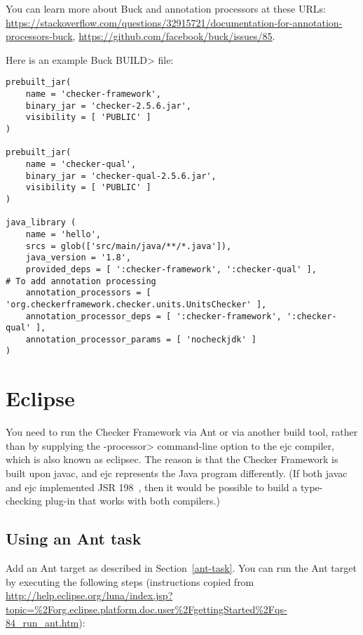 You can learn more about Buck and annotation processors at these URLs:
{\codesize\url{https://stackoverflow.com/questions/32915721/documentation-for-annotation-processors-buck}},
{\codesize\url{https://github.com/facebook/buck/issues/85}}.

Here is an example Buck \<BUILD> file:

\begin{Verbatim}
prebuilt_jar(
    name = 'checker-framework',
    binary_jar = 'checker-2.5.6.jar',
    visibility = [ 'PUBLIC' ]
)

prebuilt_jar(
    name = 'checker-qual',
    binary_jar = 'checker-qual-2.5.6.jar',
    visibility = [ 'PUBLIC' ]
)

java_library (
	name = 'hello',
	srcs = glob(['src/main/java/**/*.java']),
	java_version = '1.8',
	provided_deps = [ ':checker-framework', ':checker-qual' ],
# To add annotation processing
	annotation_processors = [ 'org.checkerframework.checker.units.UnitsChecker' ],
	annotation_processor_deps = [ ':checker-framework', ':checker-qual' ],
	annotation_processor_params = [ 'nocheckjdk' ]
)
\end{Verbatim}



\section{Eclipse\label{eclipse}}


You
need to run the Checker Framework via Ant or via another build tool, rather
than by supplying the \<-processor> command-line option to the ejc
compiler, which is also known as eclipsec.
The reason is that the Checker Framework is built upon javac,
and ejc represents the Java program differently.  (If both javac and ejc
implemented JSR 198~\cite{JSR198}, then it would be possible to build
a type-checking plug-in that works with both compilers.)


\subsection{Using an Ant task\label{eclipse-ant}}

Add an Ant target as described in Section~\ref{ant-task}.  You can
run the Ant target by executing the following steps
(instructions copied from {\codesize\url{http://help.eclipse.org/luna/index.jsp?topic=%2Forg.eclipse.platform.doc.user%2FgettingStarted%2Fqs-84_run_ant.htm}}):

